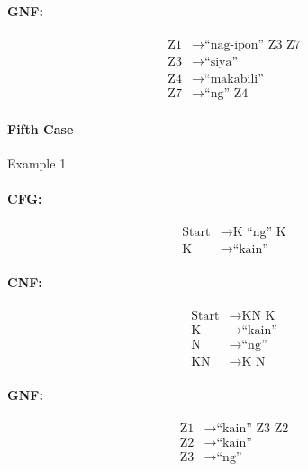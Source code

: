 \paragraph{GNF:}
\begin{equation*}
    \begin{aligned}
        \text{Z1}   & \rightarrow \text{“nag-ipon” Z3 Z7}   \\
        \text{Z3} & \rightarrow \text{“siya”} \\
        \text{Z4} & \rightarrow \text{“makabili”} \\
        \text{Z7} & \rightarrow \text{“ng” Z4}
    \end{aligned}
\end{equation*}


\paragraph{Fifth Case}
Example 1
\paragraph{CFG:}
\begin{equation*}
    \begin{aligned}
        \text{Start}   & \rightarrow \text{K “ng” K}   \\
        \text{K} & \rightarrow \text{“kain”}
    \end{aligned}
\end{equation*}

\paragraph{CNF:}
\begin{equation*}
    \begin{aligned}
        \text{Start}   & \rightarrow \text{KN K}   \\
        \text{K} & \rightarrow \text{“kain”} \\
        \text{N} & \rightarrow \text{“ng”} \\
        \text{KN} & \rightarrow \text{K N}
    \end{aligned}
\end{equation*}

\paragraph{GNF:}
\begin{equation*}
    \begin{aligned}
        \text{Z1}   & \rightarrow \text{“kain” Z3 Z2}   \\
        \text{Z2} & \rightarrow \text{“kain”} \\
        \text{Z3} & \rightarrow \text{“ng”}
    \end{aligned}
\end{equation*}

